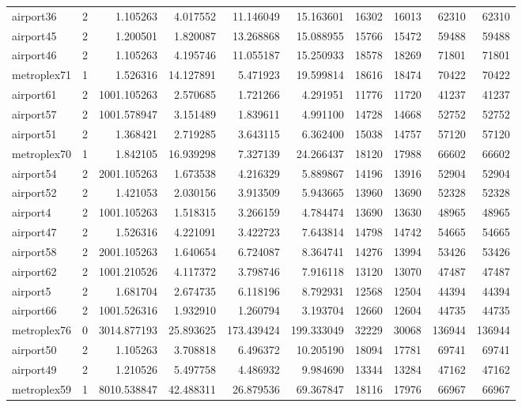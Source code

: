 \begin{longtable}{|l|r|r|r|r|r|r|r|r|r|}
airport36 & 2 & 1.105263 & 4.017552 & 11.146049 & 15.163601 & 16302 & 16013 & 62310 & 62310 \\
airport45 & 2 & 1.200501 & 1.820087 & 13.268868 & 15.088955 & 15766 & 15472 & 59488 & 59488 \\
airport46 & 2 & 1.105263 & 4.195746 & 11.055187 & 15.250933 & 18578 & 18269 & 71801 & 71801 \\
metroplex71 & 1 & 1.526316 & 14.127891 & 5.471923 & 19.599814 & 18616 & 18474 & 70422 & 70422 \\
airport61 & 2 & 1001.105263 & 2.570685 & 1.721266 & 4.291951 & 11776 & 11720 & 41237 & 41237 \\
airport57 & 2 & 1001.578947 & 3.151489 & 1.839611 & 4.991100 & 14728 & 14668 & 52752 & 52752 \\
airport51 & 2 & 1.368421 & 2.719285 & 3.643115 & 6.362400 & 15038 & 14757 & 57120 & 57120 \\
metroplex70 & 1 & 1.842105 & 16.939298 & 7.327139 & 24.266437 & 18120 & 17988 & 66602 & 66602 \\
airport54 & 2 & 2001.105263 & 1.673538 & 4.216329 & 5.889867 & 14196 & 13916 & 52904 & 52904 \\
airport52 & 2 & 1.421053 & 2.030156 & 3.913509 & 5.943665 & 13960 & 13690 & 52328 & 52328 \\
airport4 & 2 & 1001.105263 & 1.518315 & 3.266159 & 4.784474 & 13690 & 13630 & 48965 & 48965 \\
airport47 & 2 & 1.526316 & 4.221091 & 3.422723 & 7.643814 & 14798 & 14742 & 54665 & 54665 \\
airport58 & 2 & 2001.105263 & 1.640654 & 6.724087 & 8.364741 & 14276 & 13994 & 53426 & 53426 \\
airport62 & 2 & 1001.210526 & 4.117372 & 3.798746 & 7.916118 & 13120 & 13070 & 47487 & 47487 \\
airport5 & 2 & 1.681704 & 2.674735 & 6.118196 & 8.792931 & 12568 & 12504 & 44394 & 44394 \\
airport66 & 2 & 1001.526316 & 1.932910 & 1.260794 & 3.193704 & 12660 & 12604 & 44735 & 44735 \\
metroplex76 & 0 & 3014.877193 & 25.893625 & 173.439424 & 199.333049 & 32229 & 30068 & 136944 & 136944 \\
airport50 & 2 & 1.105263 & 3.708818 & 6.496372 & 10.205190 & 18094 & 17781 & 69741 & 69741 \\
airport49 & 2 & 1.210526 & 5.497758 & 4.486932 & 9.984690 & 13344 & 13284 & 47162 & 47162 \\
metroplex59 & 1 & 8010.538847 & 42.488311 & 26.879536 & 69.367847 & 18116 & 17976 & 66967 & 66967 \\

\end{longtable}
